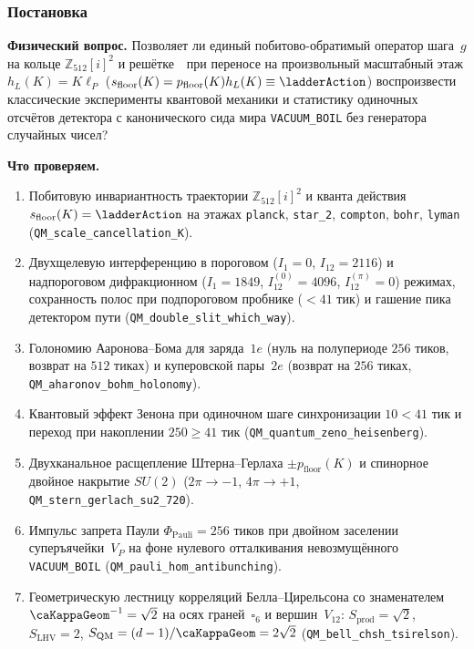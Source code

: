 \label{exp:cem05}

\subsubsection*{Постановка}
\textbf{Физический вопрос.}
Позволяет ли единый побитово-обратимый оператор шага~$g$ на кольце $\mathbb{Z}_{512}[i]^2$ и решётке~\latGCKshort\ при переносе на произвольный масштабный этаж $h_L(K)=K\ell_P$ ($s_{\mathrm{floor}}(K)=p_{\mathrm{floor}}(K)h_L(K)\equiv\ladderAction$) воспроизвести классические эксперименты квантовой механики и статистику одиночных отсчётов детектора с канонического сида мира \texttt{VACUUM\_BOIL} без генератора случайных чисел?

\textbf{Что проверяем.}
\begin{enumerate}[label=\textbf{(\alph*)},leftmargin=*,itemsep=0.25em]
\item Побитовую инвариантность траектории $\mathbb{Z}_{512}[i]^2$ и кванта действия $s_{\mathrm{floor}}(K)=\ladderAction$ на этажах \texttt{planck}, \texttt{star\_2}, \texttt{compton}, \texttt{bohr}, \texttt{lyman} (\texttt{QM\_scale\_cancellation\_K}).
\item Двухщелевую интерференцию в пороговом ($I_1=0$, $I_{12}=2116$) и надпороговом дифракционном ($I_1=1849$, $I_{12}^{(0)}=4096$, $I_{12}^{(\pi)}=0$) режимах, сохранность полос при подпороговом пробнике ($<41$ тик) и гашение пика детектором пути (\texttt{QM\_double\_slit\_which\_way}).
\item Голономию Ааронова--Бома для заряда~$1e$ (нуль на полупериоде $256$ тиков, возврат на $512$ тиках) и куперовской пары~$2e$ (возврат на $256$ тиках, \texttt{QM\_aharonov\_bohm\_holonomy}).
\item Квантовый эффект Зенона при одиночном шаге синхронизации $10 < 41$ тик и переход при накоплении $250 \ge 41$ тик (\texttt{QM\_quantum\_zeno\_heisenberg}).
\item Двухканальное расщепление Штерна--Герлаха $\pm p_{\mathrm{floor}}(K)$ и спинорное двойное накрытие $SU(2)$ ($2\pi\to -1$, $4\pi\to +1$, \texttt{QM\_stern\_gerlach\_su2\_720}).
\item Импульс запрета Паули $\Phi_{\mathrm{Pauli}}=256$ тиков при двойном заселении суперъячейки~$V_P$ на фоне нулевого отталкивания невозмущённого \texttt{VACUUM\_BOIL} (\texttt{QM\_pauli\_hom\_antibunching}).
\item Геометрическую лестницу корреляций Белла--Цирельсона со знаменателем $\caKappaGeom^{-1}=\sqrt{2}$ на осях граней~$\square_6$ и вершин~$V_{12}$: $S_{\mathrm{prod}}=\sqrt{2}$, $S_{\mathrm{LHV}}=2$, $S_{\mathrm{QM}}=(d-1)/\caKappaGeom=2\sqrt{2}$ (\texttt{QM\_bell\_chsh\_tsirelson}).

\end{enumerate}
